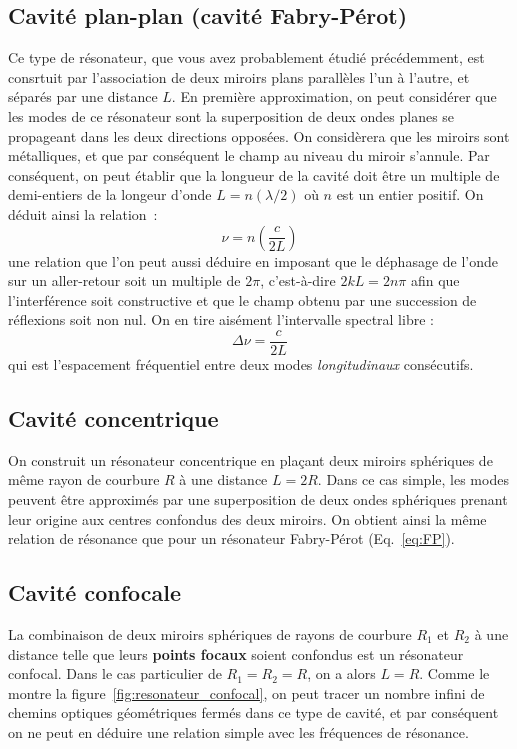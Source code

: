 \documentclass[a4paper]{book}
\begin{document}
\subsection{Cavité plan-plan (cavité Fabry-Pérot)}
Ce type de résonateur, que vous avez probablement étudié précédemment, est consrtuit par l'association de deux miroirs plans parallèles l'un à l'autre, et séparés par une distance $L$. En première approximation, on peut considérer que les modes de ce résonateur sont la superposition de deux ondes planes se propageant dans les deux directions opposées. On considèrera que les miroirs sont métalliques, et que par conséquent le champ au niveau du miroir s'annule. Par conséquent, on peut établir que la longueur de la cavité doit être un multiple de demi-entiers de la longeur d'onde $L = n(\lambda/2)$ où $n$ est un entier positif. On déduit ainsi la relation~:
\begin{equation}
    \nu = n\left(\frac{c}{2L}\right)
    \label{eq:FP}
\end{equation}
une relation que l'on peut aussi déduire en imposant que le déphasage de l'onde sur un aller-retour soit un multiple de $2\pi$, c'est-à-dire $2kL=2n\pi$ afin que l'interférence soit constructive et que le champ obtenu par une succession de réflexions soit non nul. 
On en tire aisément l'intervalle spectral libre : 
\begin{equation}
    \Delta\nu = \frac{c}{2L}
\end{equation}
qui est l'espacement fréquentiel entre deux modes \textit{longitudinaux} consécutifs.

\subsection{Cavité concentrique}
On construit un résonateur concentrique en plaçant deux miroirs sphériques de même rayon de courbure $R$ à une distance $L=2R$. Dans ce cas simple, les modes peuvent être approximés par une superposition de deux ondes sphériques prenant leur origine aux centres confondus des deux miroirs. On obtient ainsi la même relation de résonance que pour un résonateur Fabry-Pérot (Eq.~\ref{eq:FP}).

\subsection{Cavité confocale}
La combinaison de deux miroirs sphériques de rayons de courbure $R_1$ et $R_2$ à une distance telle que leurs \textbf{points focaux} soient confondus est un résonateur confocal. Dans le cas particulier de $R_1=R_2=R$, on a alors $L=R$. Comme le montre la figure~\ref{fig:resonateur_confocal}, on peut tracer un nombre infini de chemins optiques géométriques fermés dans ce type de cavité, et par conséquent on ne peut en déduire une relation simple avec les fréquences de résonance. 
\end{document}
